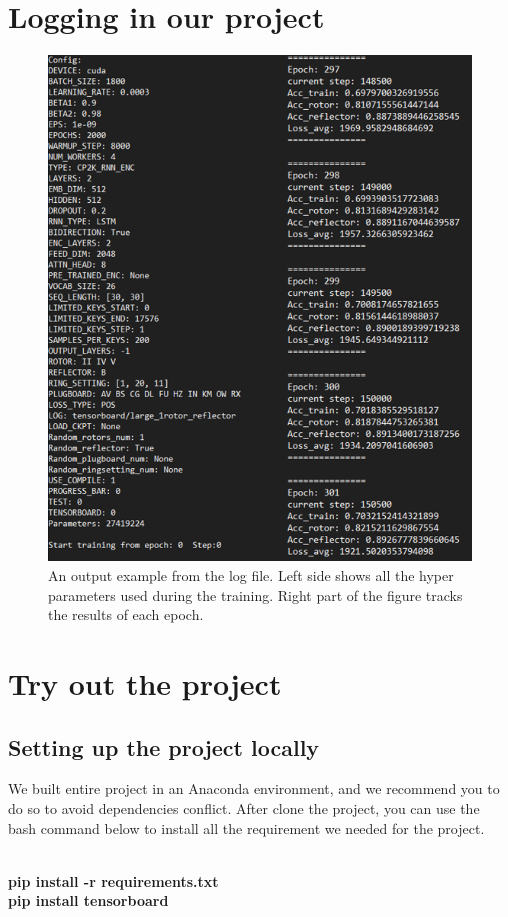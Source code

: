 \chapter{Logging in our project}
\begin{figure}[hbt!]
    \centering
    \includegraphics[width=0.7\linewidth]{myReport//figures/logfile.png}
    \caption{An output example from the log file. Left side shows all the hyper parameters used during the training. Right part of the figure tracks the results of each epoch.}
    \label{fig:enter-label}
\end{figure}

\chapter{Try out the project}
\section{Setting up the project locally}

We built entire project in an Anaconda environment, and we recommend you to do so to avoid dependencies conflict. After clone the project, you can use the bash command below to install all the requirement we needed for the project.

\begin{center}
    \\ 
    \textbf{pip install -r requirements.txt}
    \\
    \textbf{pip install tensorboard}
    \\
\end{center}

